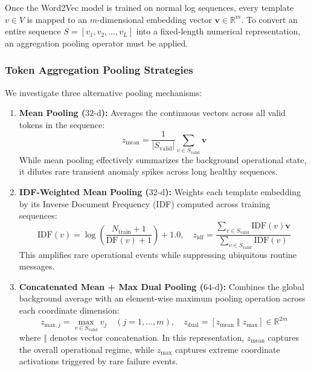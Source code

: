 Once the Word2Vec model is trained on normal log sequences, every template $v \in V$ is mapped to an $m$-dimensional embedding vector $\mathbf{v} \in \mathbb{R}^m$. To convert an entire sequence $S = [v_1, v_2, \dots, v_L]$ into a fixed-length numerical representation, an aggregation pooling operator must be applied.

\subsubsection{Token Aggregation Pooling Strategies}
\label{subsubsec:pooling_strategies}
We investigate three alternative pooling mechanisms:
\begin{enumerate}
    \item \textbf{Mean Pooling ($32\text{-d}$):} Averages the continuous vectors across all valid tokens in the sequence:
    \begin{equation}
        z_{\text{mean}} = \frac{1}{|S_{\text{valid}}|} \sum_{v \in S_{\text{valid}}} \mathbf{v}
    \end{equation}
    While mean pooling effectively summarizes the background operational state, it dilutes rare transient anomaly spikes across long healthy sequences.
    \item \textbf{IDF-Weighted Mean Pooling ($32\text{-d}$):} Weights each template embedding by its Inverse Document Frequency (IDF) computed across training sequences:
    \begin{equation}
        \text{IDF}(v) = \log \left( \frac{N_{\text{train}} + 1}{\text{DF}(v) + 1} \right) + 1.0, \quad z_{\text{idf}} = \frac{\sum_{v \in S_{\text{valid}}} \text{IDF}(v) \mathbf{v}}{\sum_{v \in S_{\text{valid}}} \text{IDF}(v)}
    \end{equation}
    This amplifies rare operational events while suppressing ubiquitous routine messages.
    \item \textbf{Concatenated Mean + Max Dual Pooling ($64\text{-d}$):} Combines the global background average with an element-wise maximum pooling operation across each coordinate dimension:
    \begin{equation}
        z_{\text{max}, j} = \max_{v \in S_{\text{valid}}} v_j \quad (j = 1, \dots, m), \quad z_{\text{dual}} = \left[ z_{\text{mean}} \;\mathbin{\Vert}\; z_{\text{max}} \right] \in \mathbb{R}^{2m}
    \end{equation}
    where $\mathbin{\Vert}$ denotes vector concatenation. In this representation, $z_{\text{mean}}$ captures the overall operational regime, while $z_{\text{max}}$ captures extreme coordinate activations triggered by rare failure events.
\end{enumerate}

